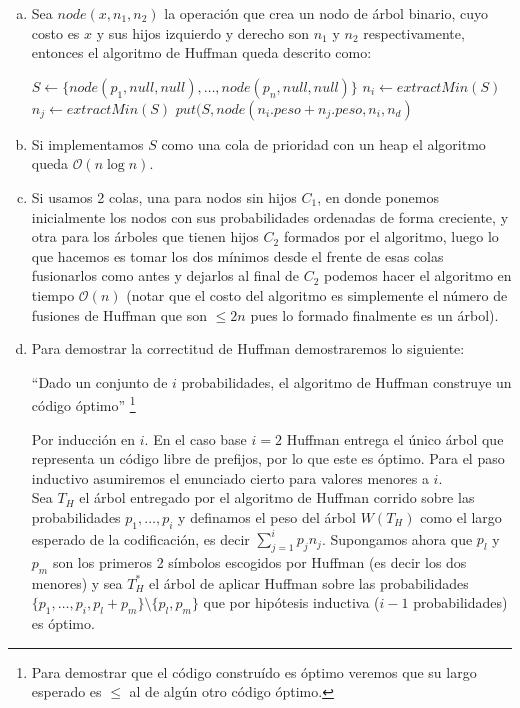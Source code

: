 \documentclass[dcc,uchile]{fcfmcourse}
\begin{document}
\begin{enumerate}[a)]
    \item Sea $node(x,n_{1},n_{2})$ la operación que crea un nodo de árbol binario, cuyo costo es $x$ y sus hijos izquierdo y derecho son $n_{1}$ y $n_{2}$ respectivamente, entonces el algoritmo de Huffman queda descrito como:
    \begin{algorithmic}
        \STATE $S\gets \{ node(p_{1},null,null),\ldots, node(p_{n},null,null)\}$
            \STATE $n_{i} \gets extractMin(S)$
            \STATE $n_{j} \gets extractMin(S)$
            \STATE $put(S, node(n_{i}.peso+n_{j}.peso, n_{i}, n_{d})$
        \ENDWHILE
    \end{algorithmic}
    \item Si implementamos $S$ como una cola de prioridad con un heap el algoritmo queda $\mathcal{O}(n\log n)$.\flash
    \item Si usamos 2 colas, una para nodos sin hijos $C_{1}$, en donde ponemos inicialmente los nodos con sus probabilidades ordenadas de forma creciente, y otra para los árboles que tienen hijos $C_{2}$ formados por el algoritmo, luego lo que hacemos es tomar los dos mínimos desde el frente de esas colas fusionarlos como antes y dejarlos al final de $C_{2}$ podemos hacer el algoritmo en tiempo $\mathcal{O}(n)$ (notar que el costo del algoritmo es simplemente el número de fusiones de Huffman que son $\le 2n$ pues lo formado finalmente es un árbol).
    \item Para demostrar la correctitud de Huffman demostraremos lo siguiente:
    \begin{center}
    ``Dado un conjunto de $i$ probabilidades, el algoritmo de Huffman construye un código óptimo'' \footnote{Para demostrar que el código construído es óptimo veremos que su largo esperado es $\le$ al de algún otro código óptimo.}
    \end{center}
    Por inducción en $i$. En el caso base $i=2$ Huffman entrega el único árbol que representa un código libre de prefijos, por lo que este es óptimo. Para el paso inductivo asumiremos el enunciado cierto para valores menores a $i$.\\
    Sea $T_{H}$ el árbol entregado por el algoritmo de Huffman corrido sobre las probabilidades $p_{1},\ldots,p_{i}$ y definamos el peso del árbol $W(T_{H})$ como el largo esperado de la codificación, es decir $\sum_{j=1}^i p_{j}n_{j}$. Supongamos ahora que $p_{l}$ y $p_{m}$ son los primeros 2 símbolos escogidos por Huffman (es decir los dos menores) y sea $T_{H}^*$ el árbol de aplicar Huffman sobre las probabilidades $\{p_{1},\ldots,p_{i}, p_{l}+p_{m}\}\setminus\{p_{l}, p_{m}\}$ que por hipótesis inductiva ($i-1$ probabilidades) es óptimo.\\
    

\end{enumerate}
\end{document}
